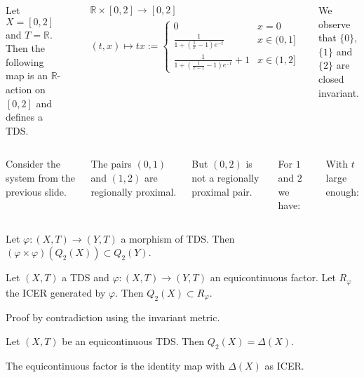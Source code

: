 \begin{frame}
  \begin{columns}
  Let $X = [0, 2]$ and $T = \mathbb{R}$.
  Then the following map is an $\mathbb{R}$-action on $[0, 2]$
  and defines a TDS.

  \begin{align*}
    &\mathbb{R} \times [0, 2] \to [0, 2] \\
    &(t, x) \mapsto
    tx := \begin{cases}
      0 & x = 0 \\
      \frac{1}{1 + (\frac{1}{x} - 1)e^{-t}} & x \in (0, 1] \\
      \frac{1}{1 + (\frac{1}{x - 1} - 1)e^{-t}} + 1 & x \in (1, 2]
    \end{cases}
  \end{align*}

  We observe that $\{0\}$, $\{1\}$ and $\{2\}$ are closed invariant.
  
  \end{columns} 
\end{frame}

\begin{frame}
  \begin{columns}
    Consider the system from the previous slide.

    The pairs $(0, 1)$ and $(1, 2)$ are regionally proximal.

    But $(0, 2)$ is not a regionally proximal pair.

    For $1$ and $2$ we have:
    
    With $t$ large enough:
    

  \end{columns}
\end{frame}

\begin{frame}
\begin{proposition}
  \label{prop:phiSqQ2XcQ2Y}
  Let $\varphi : (X,T) \to (Y,T)$ a morphism of TDS. Then $(\varphi \times \varphi) (Q_2 (X)) \subset Q_2(Y)$.
\end{proposition}
\pause
\begin{theorem}
  Let $(X,T)$ a TDS and $\varphi : (X,T) \to (Y,T)$ an equicontinuous factor.
  Let $R_\varphi$ the ICER generated by $\varphi$. Then $Q_2(X) \subset R_\varphi$.
\end{theorem}
Proof by contradiction using the invariant metric.
\pause
\begin{corollary}
 Let $(X, T)$ be an equicontinuous TDS.
  Then $Q_2(X) = \Delta(X)$.
\end{corollary}
The equicontinuous factor is the identity map with $\Delta(X)$ as ICER.
\end{frame}

